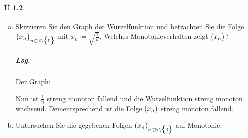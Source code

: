 \documentclass{scrreprt}
\begin{document}
\paragraph{Ü 1.2}
\begin{enumerate}[(a)]
\item Skizzieren Sie den Graph der Wurzelfunktion und betrachten Sie die Folge
  $\qty\big(x_n)_{n \in \mathbb{N} \setminus \qty\big{0}}$ mit
  $x_n \coloneqq \sqrt{\frac{1}{n}}$.
  Welches Monotonieverhalten zeigt $\qty\big(x_n)$?

  \subparagraph{Lsg.} Der Graph:


  Nun ist $\frac{1}{n}$ streng monoton fallend und die Wurzelfunktion streng
  monoton wachsend.
  Dementsprechend ist die Folge $\qty(x_n)$ streng monoton fallend.

\newpage
\item Untersuchen Sie die gegebenen Folgen
  $\qty(x_n)_{n \in \mathbb{N} \setminus \qty\big{0}}$ auf Monotonie:



\end{enumerate}
\end{document}

